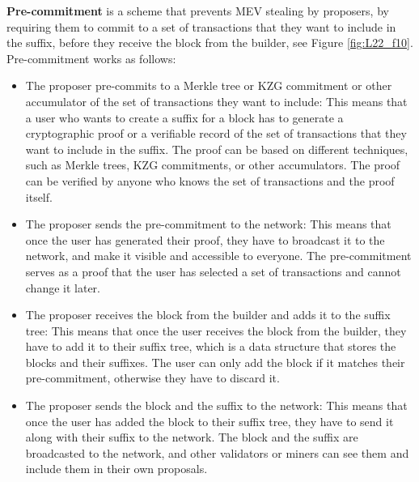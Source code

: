 \textbf{Pre-commitment} is a scheme that prevents MEV stealing by proposers, by requiring them to commit to a set of transactions that they want to include in the suffix, before they receive the block from the builder, see Figure \ref{fig:L22_f10}. Pre-commitment works as follows:
\begin{itemize}
	\item The proposer pre-commits to a Merkle tree or KZG commitment or other accumulator of the set of transactions they want to include: This means that a user who wants to create a suffix for a block has to generate a cryptographic proof or a verifiable record of the set of transactions that they want to include in the suffix. The proof can be based on different techniques, such as Merkle trees, KZG commitments, or other accumulators. The proof can be verified by anyone who knows the set of transactions and the proof itself.
	\item The proposer sends the pre-commitment to the network: This means that once the user has generated their proof, they have to broadcast it to the network, and make it visible and accessible to everyone. The pre-commitment serves as a proof that the user has selected a set of transactions and cannot change it later.
	\item The proposer receives the block from the builder and adds it to the suffix tree: This means that once the user receives the block from the builder, they have to add it to their suffix tree, which is a data structure that stores the blocks and their suffixes. The user can only add the block if it matches their pre-commitment, otherwise they have to discard it.
	\item The proposer sends the block and the suffix to the network: This means that once the user has added the block to their suffix tree, they have to send it along with their suffix to the network. The block and the suffix are broadcasted to the network, and other validators or miners can see them and include them in their own proposals.
\end{itemize}

